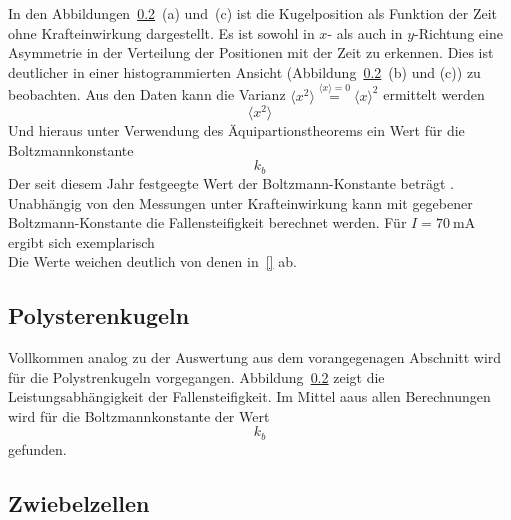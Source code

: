In den Abbildungen~\ref{}~(a) und~(c) ist die Kugelposition als Funktion der Zeit ohne Krafteinwirkung dargestellt.
Es ist sowohl in $x$- als auch in $y$-Richtung eine Asymmetrie in der Verteilung der Positionen mit der Zeit zu erkennen.
Dies ist deutlicher in einer histogrammierten Ansicht (Abbildung~\ref{}~(b) und (c)) zu beobachten.
Aus den Daten kann die Varianz $\langle x^2 \rangle \overset{\langle x \rangle = 0} = \langle x\rangle^2$ ermittelt werden
\begin{equation}
  \langle x^2 \rangle
\end{equation}
Und hieraus unter Verwendung des Äquipartionstheorems ein Wert für die Boltzmannkonstante
\begin{equation}
k_b
\end{equation}
Der seit diesem Jahr festgeegte Wert der Boltzmann-Konstante beträgt . Unabhängig von den Messungen unter Krafteinwirkung
kann mit gegebener Boltzmann-Konstante die Fallensteifigkeit berechnet werden. Für $I = \SI{70}{\milli\ampere}$ ergibt sich
exemplarisch
\begin{equation}

\end{equation}
Die Werte weichen deutlich von denen in~\eqref{} ab.

\subsection{Polysterenkugeln}
Vollkommen analog zu der Auswertung aus dem vorangegenagen Abschnitt wird für die Polystrenkugeln vorgegangen.
Abbildung~\ref{} zeigt die Leistungsabhängigkeit der Fallensteifigkeit. Im Mittel aaus allen
Berechnungen wird für die Boltzmannkonstante der Wert
\begin{equation}
  k_b
\end{equation}
gefunden.

\subsection{Zwiebelzellen}
